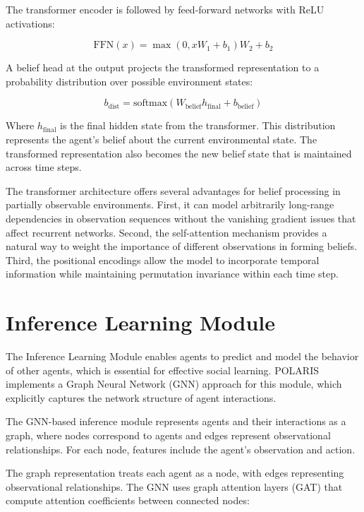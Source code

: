 \documentclass[a4paper,12pt]{report}
\begin{document}
The transformer encoder is followed by feed-forward networks with ReLU activations:

\begin{equation}
    \text{FFN}(x) = \max(0, xW_1 + b_1)W_2 + b_2
\end{equation}

A belief head at the output projects the transformed representation to a probability distribution over possible environment states:

\begin{equation}
    b_{\text{dist}} = \text{softmax}(W_{\text{belief}}h_{\text{final}} + b_{\text{belief}})
\end{equation}

Where $h_{\text{final}}$ is the final hidden state from the transformer. This distribution represents the agent's belief about the current environmental state. The transformed representation also becomes the new belief state that is maintained across time steps.

The transformer architecture offers several advantages for belief processing in partially observable environments. First, it can model arbitrarily long-range dependencies in observation sequences without the vanishing gradient issues that affect recurrent networks. Second, the self-attention mechanism provides a natural way to weight the importance of different observations in forming beliefs. Third, the positional encodings allow the model to incorporate temporal information while maintaining permutation invariance within each time step.

\section{Inference Learning Module}

The Inference Learning Module enables agents to predict and model the behavior of other agents, which is essential for effective social learning. POLARIS implements a Graph Neural Network (GNN) approach for this module, which explicitly captures the network structure of agent interactions.

The GNN-based inference module represents agents and their interactions as a graph, where nodes correspond to agents and edges represent observational relationships. For each node, features include the agent's observation and action.

The graph representation treats each agent as a node, with edges representing observational relationships. The GNN uses graph attention layers (GAT) that compute attention coefficients between connected nodes:
\end{document}

